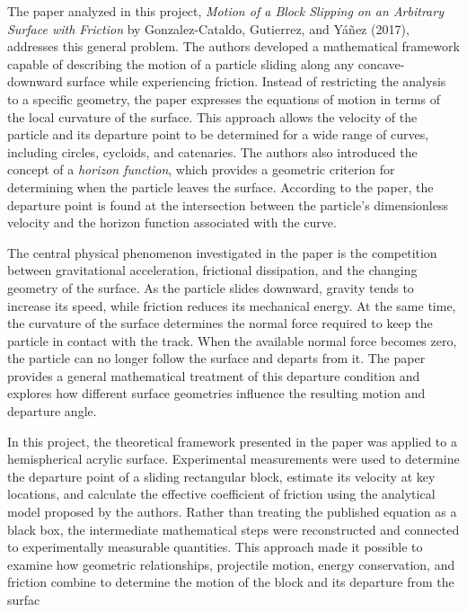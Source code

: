 \documentclass[11pt,letterpaper]{article}
\begin{document}
The paper analyzed in this project, \textit{Motion of a Block Slipping on an Arbitrary Surface with Friction} by Gonzalez-Cataldo, Gutierrez, and Yáñez (2017), addresses this general problem. The authors developed a mathematical framework capable of describing the motion of a particle sliding along any concave-downward surface while experiencing friction. Instead of restricting the analysis to a specific geometry, the paper expresses the equations of motion in terms of the local curvature of the surface. This approach allows the velocity of the particle and its departure point to be determined for a wide range of curves, including circles, cycloids, and catenaries. The authors also introduced the concept of a \textit{horizon function}, which provides a geometric criterion for determining when the particle leaves the surface. According to the paper, the departure point is found at the intersection between the particle's dimensionless velocity and the horizon function associated with the curve.

The central physical phenomenon investigated in the paper is the competition between gravitational acceleration, frictional dissipation, and the changing geometry of the surface. As the particle slides downward, gravity tends to increase its speed, while friction reduces its mechanical energy. At the same time, the curvature of the surface determines the normal force required to keep the particle in contact with the track. When the available normal force becomes zero, the particle can no longer follow the surface and departs from it. The paper provides a general mathematical treatment of this departure condition and explores how different surface geometries influence the resulting motion and departure angle.

In this project, the theoretical framework presented in the paper was applied to a hemispherical acrylic surface. Experimental measurements were used to determine the departure point of a sliding rectangular block, estimate its velocity at key locations, and calculate the effective coefficient of friction using the analytical model proposed by the authors. Rather than treating the published equation as a black box, the intermediate mathematical steps were reconstructed and connected to experimentally measurable quantities. This approach made it possible to examine how geometric relationships, projectile motion, energy conservation, and friction combine to determine the motion of the block and its departure from the surfac

\end{document}
